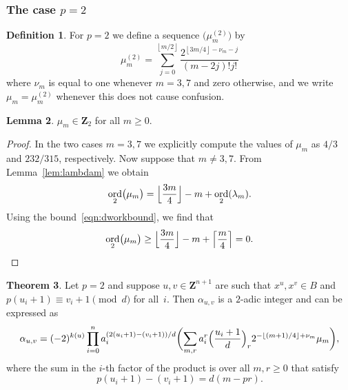 \documentclass[a4paper,11pt]{article}
\numberwithin{equation}{section}
\providecommand{\floor}[1]{\left\lfloor#1\right\rfloor}   %
\providecommand{\floorBig}[1]{\Bigl\lfloor#1\Bigr\rfloor} %
\providecommand{\ceil}[1]{\left\lceil#1\right\rceil}   %
\newcommand{\ZZ}{\mathbf{Z}} %
\DeclareMathOperator{\ord}{ord}          %
\theoremstyle{definition}
\newtheorem{thm}{Theorem}[section]
\newtheorem{lem}[thm]{Lemma}
\newtheorem{defn}[thm]{Definition}
\begin{document}
\subsubsection{The case $p = 2$}

\begin{defn} \label{defn:mu2}
For $p = 2$ we define a sequence $\bigl(\mu_m^{(2)}\bigr)$ by 
\begin{equation*}
\mu_m^{(2)} = 
    \sum_{j=0}^{\floor{m/2}} \frac{2^{\floor{3m/4} - \nu_m - j}}{(m-2j)! j!}
\end{equation*}
where $\nu_m$ is equal to one whenever $m = 3, 7$ and zero otherwise, 
and we write $\mu_m =\mu_m^{(2)}$ whenever this does not cause confusion. 
\end{defn}

\begin{lem} \label{lem:mu2}
$\mu_m \in \ZZ_2$ for all $m \geq 0$.
\end{lem}

\begin{proof}
In the two cases $m = 3, 7$ we explicitly compute the values of 
$\mu_m$ as $4/3$ and $232/315$, respectively.  Now suppose that 
$m \neq 3, 7$.  From Lemma~\ref{lem:lambdam} we obtain 
\begin{equation*}
\ord_2 \bigl(\mu_m\bigr) 
    = \floorBig{\frac{3m}{4}} - m + \ord_2(\lambda_m).
\end{equation*}
Using the bound~\eqref{eqn:dworkbound}, we find that 
\begin{equation*}
\ord_2 \bigl(\mu_m\bigr) 
    \geq \floorBig{\frac{3m}{4}} - m + \ceil{\frac{m}{4}} = 0. \qedhere
\end{equation*}
\end{proof}

\begin{thm} \label{thm:alpha2}
Let $p = 2$ and suppose $u, v \in \ZZ^{n+1}$ are such that 
$x^u, x^v \in B$ and $p (u_i + 1) \equiv v_i + 1 \pmod{d}$ 
for all~$i$.  Then $\alpha_{u,v}$ is a $2$-adic integer and can be expressed as 
\begin{equation*}
\alpha_{u,v} = (-2)^{k(u)} \prod_{i=0}^n a_i^{(2 (u_i + 1) - (v_i + 1))/d} \biggl( \sum_{m,r} a_i^{r} \Bigl(\frac{u_i+1}{d}\Bigr)_r 2^{-\floor{(m+1)/4}+\nu_m} \mu_m \biggr), 
\end{equation*}
where the sum in the $i$-th factor of the product is over all $m, r \geq 0$  
that satisfy
\[
p(u_i+1)-(v_i+1)=d(m-pr).
\]
\end{thm}
\end{document}

